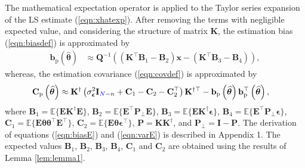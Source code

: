 The mathematical expectation operator is applied to the Taylor series expansion of the LS estimate (\ref{eqn:xhatexp}).
After removing the terms with negligible expected value, and considering the structure of matrix $\mathbf{K}$, the estimation bias (\ref{eqn:biasdef}) is approximated by 
\begin{equation} \begin{aligned} \mathbf{b}_{\mathrm{p}} \left( \widehat{\bm{\theta}} \right) & \approx \mathbf{Q}^{-1} \left( \left( \mathbf{K}^\top \mathbf{B}_1 - \mathbf{B}_2 \right) \mathbf{x} - \left( \mathbf{K}^\top \mathbf{B}_3 - \mathbf{B}_4 \right) \right) , \end{aligned} \label{eqn:biasE} \end{equation}
whereas, the estimation covariance (\ref{eqn:covdef}) is approximated by 
\begin{equation} \begin{aligned} \mathbf{C}_{\mathrm{p}} \left( \widehat{\bm{\theta}} \right) & \approx \mathbf{K}^\dagger \left( \sigma_{\bm{\epsilon}}^2 \mathbf{I}_{\color{blue}N\color{black}-n} + \mathbf{C}_1 - \mathbf{C}_2 - \mathbf{C}_2^\top \right) \mathbf{K}^{\dagger \top} - \mathbf{b}_{\mathrm{p}} \left( \widehat{\bm{\theta}} \right) \mathbf{b}_{\mathrm{p}}^\top \left( \widehat{\bm{\theta}} \right) , \end{aligned} \label{eqn:varE} \end{equation}
where $\mathbf{B}_1 = \mathbb{E} \Big\{ \mathbf{E} \mathbf{K}^\dagger \mathbf{E} \Big\}$, $\mathbf{B}_2 = \mathbb{E} \Big\{ \mathbf{E}^\top \mathbf{P}_\perp \mathbf{E} \Big\}$, $\mathbf{B}_3 = \mathbb{E} \Big\{ \mathbf{E} \mathbf{K}^\dagger \bm{\epsilon} \Big\}$, $\mathbf{B}_4 = \mathbb{E} \Big\{ \mathbf{E}^\top \mathbf{P}_\perp \bm{\epsilon} \Big\}$, $\mathbf{C}_1 = \mathbb{E} \Big\{ \mathbf{E} \bm{\theta} \bm{\theta}^\top \mathbf{E}^\top \Big\}$, $\mathbf{C}_2 = \mathbb{E} \Big\{ \mathbf{E} \bm{\theta} \bm{\epsilon}^\top \Big\}$, $\mathbf{P} = \mathbf{K} \mathbf{K}^\dagger$, and $\mathbf{P}_\perp = \mathbf{I} - \mathbf{P}$. 
The derivation of equations (\ref{eqn:biasE}) and (\ref{eqn:varE}) is described in Appendix 1.
The expected values $\mathbf{B}_1$, $\mathbf{B}_2$, $\mathbf{B}_3$, $\mathbf{B}_4$, $\mathbf{C}_1$ and $\mathbf{C}_2$ are obtained using the results of Lemma \ref{lem:lemma1}.



